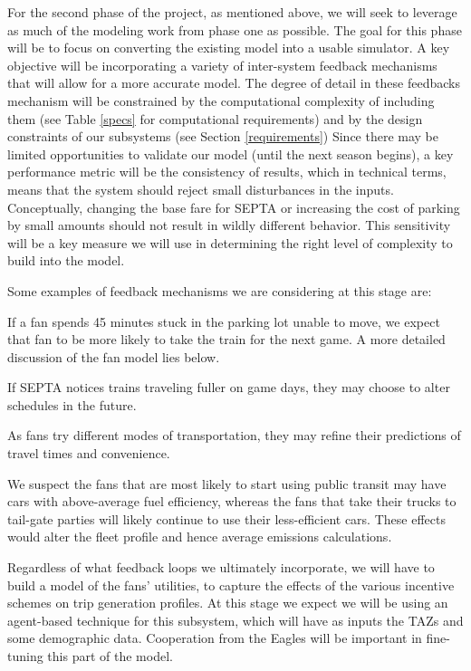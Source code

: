\documentclass[12pt]{article}
\begin{document}
For the second phase of the project, as mentioned above, we will seek
to leverage as much of the modeling work from phase one as
possible. The goal for this phase will be to focus on converting the
existing model into a usable simulator. A key objective will be
incorporating a variety of inter-system feedback mechanisms that will
allow for a more accurate model.  The degree of detail in these
feedbacks mechanism will be constrained by the computational
complexity of including them (see Table \ref{specs} for computational
requirements) and by the design constraints of our subsystems (see
Section \ref{requirements}) Since there may be limited opportunities
to validate our model (until the next season begins), a key
performance metric will be the consistency of results, which in
technical terms, means that the system should reject small
disturbances in the inputs.  Conceptually, changing the base fare for
SEPTA or increasing the cost of parking by small amounts should not
result in wildly different behavior. This sensitivity will be a key
measure we will use in determining the right level of complexity to
build into the model.

Some examples of feedback mechanisms we are considering at this stage
are:

\begin{description}[style=nextline]
    \item[Congestion] If a fan spends 45 minutes stuck in the parking
  lot unable to move, we expect that fan to be more likely to take the
  train for the next game. A more detailed discussion of the fan model
  lies below.
    \item[Scheduling] If SEPTA notices trains traveling fuller on game
  days, they may choose to alter schedules in the future.
    \item[Uncertainty Effects] As fans try different modes of
  transportation, they may refine their predictions of travel times
  and convenience.
    \item[Fleet Composition] We suspect the fans that are most likely
  to start using public transit may have cars with above-average fuel
  efficiency, whereas the fans that take their trucks to tail-gate
  parties will likely continue to use their less-efficient cars.
  These effects would alter the fleet profile and hence average
  emissions calculations.
\end{description}

Regardless of what feedback loops we ultimately incorporate, we will
have to build a model of the fans' utilities, to capture the effects
of the various incentive schemes on trip generation profiles. At this
stage we expect we will be using an agent-based technique for this
subsystem, which will have as inputs the TAZs and some demographic
data. Cooperation from the Eagles will be important in fine-tuning
this part of the model.
\end{document}
